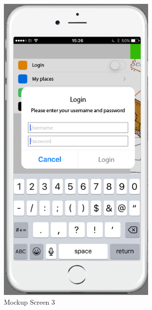 \begin{figure}[h]
\centering
    \includegraphics[width=0.7\textwidth]{mockup1-3}
    \caption{Mockup Screen 3}
    \label{fig:mesh3}
\end{figure}

